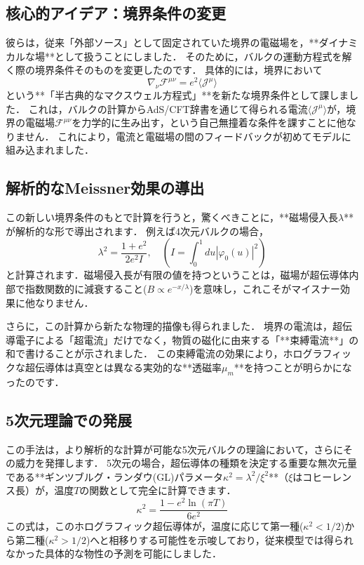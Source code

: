\documentclass[b5paper,11pt,dvipdfmx]{jsarticle}
\numberwithin{equation}{section}
\theoremstyle{definition}
\begin{document}
\subsection{核心的アイデア：境界条件の変更}

彼らは，従来「外部ソース」として固定されていた境界の電磁場を，**ダイナミカルな場**として扱うことにしました．
そのために，バルクの運動方程式を解く際の境界条件そのものを変更したのです．
具体的には，境界において
\begin{equation}
    \nabla_\nu \mathcal{F}^{\mu\nu} = e^2 \langle \mathcal{J}^\mu \rangle
\end{equation}
という**「半古典的なマクスウェル方程式」**を新たな境界条件として課しました．
これは，バルクの計算からAdS/CFT辞書を通じて得られる電流$\langle \mathcal{J}^\mu \rangle$が，境界の電磁場$\mathcal{F}^{\mu\nu}$を力学的に生み出す，という自己無撞着な条件を課すことに他なりません．
これにより，電流と電磁場の間のフィードバックが初めてモデルに組み込まれました．

\subsection{解析的なMeissner効果の導出}

この新しい境界条件のもとで計算を行うと，驚くべきことに，**磁場侵入長$\lambda$**が解析的な形で導出されます\cite{Natsuume22}．
例えば4次元バルクの場合，
$$ \lambda^2 = \frac{1+e^2}{2e^2 I}, \quad \left(I = \int_0^1 du |\varphi_0(u)|^2\right) $$
と計算されます．磁場侵入長が有限の値を持つということは，磁場が超伝導体内部で指数関数的に減衰すること($B \propto e^{-x/\lambda}$)を意味し，これこそがマイスナー効果に他なりません．

さらに，この計算から新たな物理的描像も得られました．
境界の電流は，超伝導電子による「超電流」だけでなく，物質の磁化に由来する「**束縛電流**」の和で書けることが示されました．
この束縛電流の効果により，ホログラフィックな超伝導体は真空とは異なる実効的な**透磁率$\mu_m$**を持つことが明らかになったのです．

\subsection{5次元理論での発展}

この手法は，より解析的な計算が可能な5次元バルクの理論において，さらにその威力を発揮します．
5次元の場合，超伝導体の種類を決定する重要な無次元量である**ギンツブルグ・ランダウ(GL)パラメータ$\kappa^2 = \lambda^2 / \xi^2$**（$\xi$はコヒーレンス長）が，温度$T$の関数として完全に計算できます\cite{Natsuume22}．
$$ \kappa^2 = \frac{1 - e^2 \ln(\pi T)}{6e^2} $$
この式は，このホログラフィック超伝導体が，温度に応じて第一種($\kappa^2 < 1/2$)から第二種($\kappa^2 > 1/2$)へと相移りする可能性を示唆しており，従来模型では得られなかった具体的な物性の予測を可能にしました．
\end{document}
